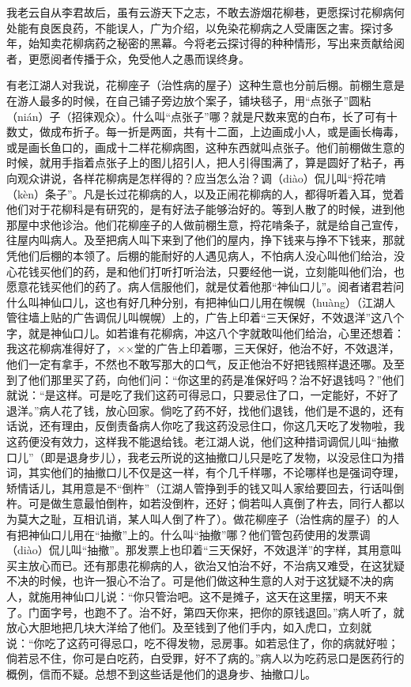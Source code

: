 \documentclass[12pt,UTF8]{ctexbook}
\begin{document}
我老云自从李君故后，虽有云游天下之志，不敢去游烟花柳巷，更愿探讨花柳病何处能有良医良药，不能误人，广为介绍，以免染花柳病之人受庸医之害。探讨多年，始知卖花柳病药之秘密的黑幕。今将老云探讨得的种种情形，写出来贡献给阅者，更愿阅者传播于众，免受他人之愚而误终身。

有老江湖人对我说，花柳座子（治性病的屋子）这种生意也分前后棚。前棚生意是在游人最多的时候，在自己铺子旁边放个案子，铺块毯子，用“点张子”圆粘（nián）子（招徕观众）。什么叫“点张子”哪？就是尺数来宽的白布，长了可有十数丈，做成布折子。每一折是两面，共有十二面，上边画成小人，或是画长梅毒，或是画长鱼口的，画成十二样花柳病图，这种东西就叫点张子。他们前棚做生意的时候，就用手指着点张子上的图儿招引人，把人引得围满了，算是圆好了粘子，再向观众讲说，各样花柳病是怎样得的？应当怎么治？调（diào）侃儿叫“捋花啃（kèn）条子”。凡是长过花柳病的人，以及正闹花柳病的人，都得听着入耳，觉着他们对于花柳科是有研究的，是有好法子能够治好的。等到人散了的时候，进到他那屋中求他诊治。他们花柳座子的人做前棚生意，捋花啃条子，就是给自己宣传，往屋内叫病人。及至把病人叫下来到了他们的屋内，挣下钱来与挣不下钱来，那就凭他们后棚的本领了。后棚的能耐好的人遇见病人，不怕病人没心叫他们给治，没心花钱买他们的药，是和他们打听打听治法，只要经他一说，立刻能叫他们治，也愿意花钱买他们的药了。病人信服他们，就是仗着他那“神仙口儿”。阅者诸君若问什么叫神仙口儿，这也有好几种分别，有把神仙口儿用在幌幌（huàng）（江湖人管往墙上贴的广告调侃儿叫幌幌）上的，广告上印着“三天保好，不效退洋”这八个字，就是神仙口儿。如若谁有花柳病，冲这八个字就敢叫他们给治，心里还想着：我这花柳病准得好了，××堂的广告上印着哪，三天保好，他治不好，不效退洋，他们一定有拿手，不然也不敢写那大的口气，反正他治不好把钱照样退还哪。及至到了他们那里买了药，向他们问：“你这里的药是准保好吗？治不好退钱吗？”他们就说：“是这样。可是吃了我们这药可得忌口，只要忌住了口，一定能好，不好了退洋。”病人花了钱，放心回家。倘吃了药不好，找他们退钱，他们是不退的，还有话说，还有理由，反倒责备病人你吃了我这药没忌住口，你这几天吃了发物啦，我这药便没有效力，这样我不能退给钱。老江湖人说，他们这种措词调侃儿叫“抽撤口儿”（即是退身步儿），我老云所说的这抽撤口儿只是吃了发物，以没忌住口为措词，其实他们的抽撤口儿不仅是这一样，有个几千样哪，不论哪样也是强词夺理，矫情话儿，其用意是不“倒杵”（江湖人管挣到手的钱又叫人家给要回去，行话叫倒杵。可是做生意最怕倒杵，如若没倒杵，还好；倘若叫人真倒了杵去，同行人都以为莫大之耻，互相讥诮，某人叫人倒了杵了）。做花柳座子（治性病的屋子）的人有把神仙口儿用在“抽撤”上的。什么叫“抽撤”哪？他们管包药使用的发票调（diào）侃儿叫“抽撤”。那发票上也印着“三天保好，不效退洋”的字样，其用意叫买主放心而已。还有那患花柳病的人，欲治又怕治不好，不治病又难受，在这犹疑不决的时候，也许一狠心不治了。可是他们做这种生意的人对于这犹疑不决的病人，就施用神仙口儿说：“你只管治吧。这不是摊子，这天在这里摆，明天不来了。门面字号，也跑不了。治不好，第四天你来，把你的原钱退回。”病人听了，就放心大胆地把几块大洋给了他们。及至钱到了他们手内，如入虎口，立刻就说：“你吃了这药可得忌口，吃不得发物，忌房事。如若忌住了，你的病就好啦；倘若忌不住，你可是白吃药，白受罪，好不了病的。”病人以为吃药忌口是医药行的概例，信而不疑。总想不到这些话是他们的退身步、抽撤口儿。
\end{document}
